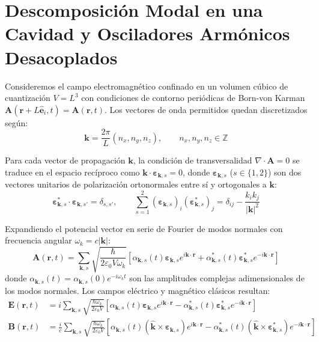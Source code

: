 \documentclass[11pt,a4paper]{book}
\begin{document}
\section{Descomposición Modal en una Cavidad y Osciladores Armónicos Desacoplados}

Consideremos el campo electromagnético confinado en un volumen cúbico de cuantización $V = L^3$ con condiciones de contorno periódicas de Born-von Karman $\mathbf{A}(\mathbf{r} + L\hat{\mathbf{e}}_i, t) = \mathbf{A}(\mathbf{r}, t)$. Los vectores de onda permitidos quedan discretizados según:
\begin{equation}
\mathbf{k} = \frac{2\pi}{L}(n_x, n_y, n_z), \qquad n_x, n_y, n_z \in \mathbb{Z}
\end{equation}

Para cada vector de propagación $\mathbf{k}$, la condición de transversalidad $\nabla \cdot \mathbf{A} = 0$ se traduce en el espacio recíproco como $\mathbf{k} \cdot \bm{\varepsilon}_{\mathbf{k},s} = 0$, donde $\bm{\varepsilon}_{\mathbf{k},s}$ ($s \in \{1, 2\}$) son dos vectores unitarios de polarización ortonormales entre sí y ortogonales a $\mathbf{k}$:
\begin{equation}
\bm{\varepsilon}_{\mathbf{k},s}^* \cdot \bm{\varepsilon}_{\mathbf{k},s'} = \delta_{s,s'}, \qquad \sum_{s=1}^2 (\bm{\varepsilon}_{\mathbf{k},s})_i (\bm{\varepsilon}_{\mathbf{k},s}^*)_j = \delta_{ij} - \frac{k_i k_j}{|\mathbf{k}|^2}
\end{equation}

Expandiendo el potencial vector en serie de Fourier de modos normales con frecuencia angular $\omega_k = c|\mathbf{k}|$:
\begin{equation}
\mathbf{A}(\mathbf{r}, t) = \sum_{\mathbf{k}, s} \sqrt{\frac{\hbar}{2\varepsilon_0 V \omega_k}} \left[ \alpha_{\mathbf{k},s}(t) \bm{\varepsilon}_{\mathbf{k},s} e^{i\mathbf{k}\cdot\mathbf{r}} + \alpha_{\mathbf{k},s}^*(t) \bm{\varepsilon}_{\mathbf{k},s}^* e^{-i\mathbf{k}\cdot\mathbf{r}} \right]
\end{equation}
donde $\alpha_{\mathbf{k},s}(t) = \alpha_{\mathbf{k},s}(0) e^{-i\omega_k t}$ son las amplitudes complejas adimensionales de los modos normales. Los campos eléctrico y magnético clásicos resultan:
\begin{align}
\mathbf{E}(\mathbf{r}, t) &= i \sum_{\mathbf{k}, s} \sqrt{\frac{\hbar \omega_k}{2\varepsilon_0 V}} \left[ \alpha_{\mathbf{k},s}(t) \bm{\varepsilon}_{\mathbf{k},s} e^{i\mathbf{k}\cdot\mathbf{r}} - \alpha_{\mathbf{k},s}^*(t) \bm{\varepsilon}_{\mathbf{k},s}^* e^{-i\mathbf{k}\cdot\mathbf{r}} \right] \\
\mathbf{B}(\mathbf{r}, t) &= \frac{i}{c} \sum_{\mathbf{k}, s} \sqrt{\frac{\hbar \omega_k}{2\varepsilon_0 V}} \left[ \alpha_{\mathbf{k},s}(t) (\hat{\mathbf{k}} \times \bm{\varepsilon}_{\mathbf{k},s}) e^{i\mathbf{k}\cdot\mathbf{r}} - \alpha_{\mathbf{k},s}^*(t) (\hat{\mathbf{k}} \times \bm{\varepsilon}_{\mathbf{k},s}^*) e^{-i\mathbf{k}\cdot\mathbf{r}} \right]
\end{align}
\end{document}
